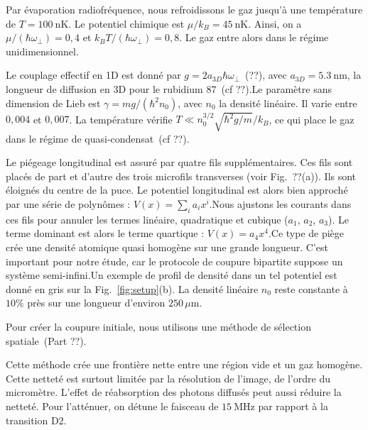 Par évaporation radiofréquence, nous refroidissons le gaz jusqu'à une température de $T = 100~\mathrm{nK}$. Le potentiel chimique est $\mu/k_B = 45~\mathrm{nK}$. Ainsi, on a $\mu/(\hbar\omega_\perp) = 0,4$ et $k_B T/(\hbar\omega_\perp) = 0,8$. Le gaz entre alors dans le régime unidimensionnel.

Le couplage effectif en 1D est donné par $g = 2 a_{3D} \hbar \omega_\perp$~(??), avec $a_{3D} = 5.3~\mathrm{nm}$, la longueur de diffusion en 3D pour le rubidium 87~(cf {??}).Le paramètre sans dimension de Lieb est $\gamma = mg / (\hbar^2 n_0)$, avec $n_0$ la densité linéaire. Il varie entre $0,004$ et $0,007$. La température vérifie $T \ll n_0^{3/2} \sqrt{\hbar^2 g / m}/k_B$, ce qui place le gaz dans le régime de quasi-condensat~(cf {??}).

Le piégeage longitudinal est assuré par quatre fils supplémentaires. Ces fils sont placés de part et d’autre des trois microfils transverses (voir Fig.~??(a)). Ils sont éloignés du centre de la puce. Le potentiel longitudinal est alors bien approché par une série de polynômes : $V(x) = \sum_i a_i x^i$.Nous ajustons les courants dans ces fils pour annuler les termes linéaire, quadratique et cubique ($a_1$, $a_2$, $a_3$). Le terme dominant est alors le terme quartique : $V(x) = a_4 x^4$.Ce type de piège crée une densité atomique quasi homogène sur une grande longueur. C’est important pour notre étude, car le protocole de coupure bipartite suppose un système semi-infini.Un exemple de profil de densité dans un tel potentiel est donné en gris sur la Fig.~\ref{fig:setup}(b). La densité linéaire $n_0$ reste constante à $10\%$ près sur une longueur d’environ $250\,\mu$m.

Pour créer la coupure initiale, nous utilisons une méthode de sélection spatiale~(Part {??}). %

Cette méthode crée une frontière nette entre une région vide et un gaz homogène. Cette netteté est surtout limitée par la résolution de l’image, de l’ordre du micromètre. L’effet de réabsorption des photons diffusés peut aussi réduire la netteté. Pour l’atténuer, on détune le faisceau de $15 ~\mathrm{MHz}$ par rapport à la transition D2.


